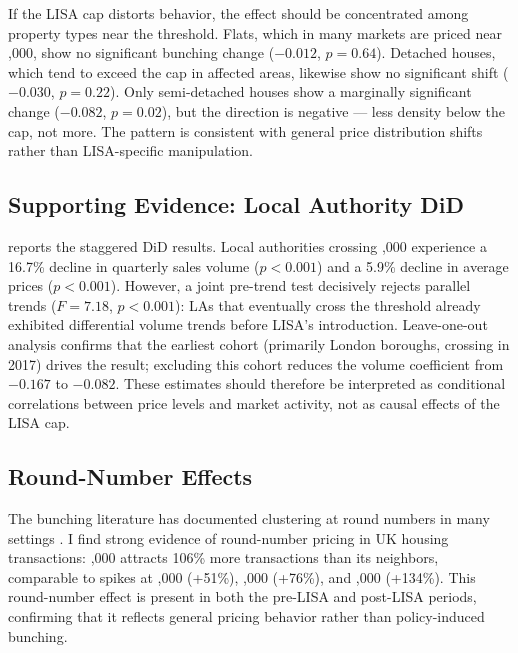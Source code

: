 \documentclass[12pt]{article}
\begin{document}
If the LISA cap distorts behavior, the effect should be concentrated among property types near the threshold. Flats, which in many markets are priced near ,000, show no significant bunching change ($-0.012$, $p = 0.64$). Detached houses, which tend to exceed the cap in affected areas, likewise show no significant shift ($-0.030$, $p = 0.22$). Only semi-detached houses show a marginally significant change ($-0.082$, $p = 0.02$), but the direction is negative --- less density below the cap, not more. The pattern is consistent with general price distribution shifts rather than LISA-specific manipulation.

\subsection{Supporting Evidence: Local Authority DiD}



 reports the staggered DiD results. Local authorities crossing ,000 experience a 16.7\% decline in quarterly sales volume ($p < 0.001$) and a 5.9\% decline in average prices ($p < 0.001$). However, a joint pre-trend test decisively rejects parallel trends ($F = 7.18$, $p < 0.001$): LAs that eventually cross the threshold already exhibited differential volume trends before LISA's introduction. Leave-one-out analysis confirms that the earliest cohort (primarily London boroughs, crossing in 2017) drives the result; excluding this cohort reduces the volume coefficient from $-0.167$ to $-0.082$. These estimates should therefore be interpreted as conditional correlations between price levels and market activity, not as causal effects of the LISA cap.

\subsection{Round-Number Effects}

The bunching literature has documented clustering at round numbers in many settings \citep{kleven2016, best2018}. I find strong evidence of round-number pricing in UK housing transactions: ,000 attracts 106\% more transactions than its neighbors, comparable to spikes at ,000 (+51\%), ,000 (+76\%), and ,000 (+134\%). This round-number effect is present in both the pre-LISA and post-LISA periods, confirming that it reflects general pricing behavior rather than policy-induced bunching.
\end{document}

